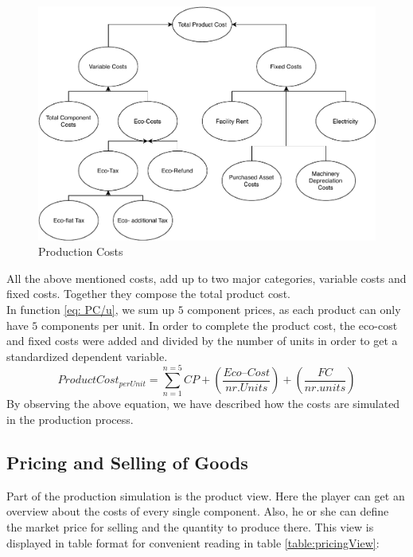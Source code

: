 \begin{figure}[ht]
	\centering
		\includegraphics[scale=0.55]{images/ProductCost.pdf}
	\caption{Production Costs}
	\label{fig:productionCosts}
\end{figure}
All the above mentioned costs, add up to two major categories, variable costs and fixed costs. Together they compose the total product cost.\\
 In function \ref{eq: PC/u}, we sum up $5$ component prices, as each product can only have $5$ components per unit. In order to complete the product cost, the eco-cost and fixed costs were added and divided by the number of units in order to get a standardized dependent variable.
\begin{equation}
	Product Cost_{per Unit}= \sum_{n=1}^{n=5}CP + (\frac{Eco–Cost}{nr. Units}) + (\frac{FC}{nr. units}) 
	\label{eq: PC/u}
\end{equation}
By observing the above equation, we have described how the costs are simulated in the production process. 

\subsection{Pricing and Selling of Goods}
\label{sec:pricing_mechanics}

Part of the production simulation is the product view. Here the player can get an overview about the costs of every single component. Also, he or she can define the market price for selling and the quantity to produce there. This view is displayed in table format for convenient reading in table \ref{table:pricingView}:

